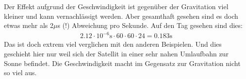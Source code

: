 \begin{refsection}
\noindent{}Der Effekt aufgrund der Geschwindigkeit ist gegenüber der Gravitation viel kleiner und kann vernachlässigt werden. Aber gesamthaft gesehen sind es doch etwas mehr als 2$\mu$s (!) Abweichung pro Sekunde. Auf den Tag gesehen sind dies:
\begin{align*}
2.12 \cdot 10^{-6}\text{s} \cdot 60 \cdot 60 \cdot 24 = 0.183\text{s}
\end{align*}
\noindent{}Das ist doch extrem viel verglichen mit den anderen Beispielen. Und dies geschieht hier nur weil sich der Satellit in einer sehr nahen Umlaufbahn zur Sonne befindet. Die Geschwindigkeit macht im Gegensatz zur Gravitation nicht so viel aus. 

\printbibliography[heading=subbibliography]
\end{refsection}